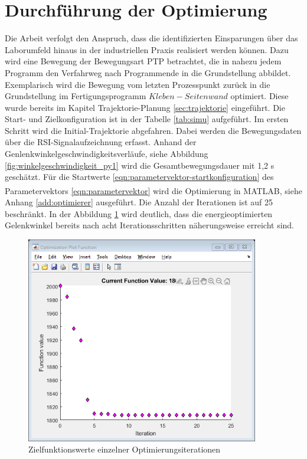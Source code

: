 \section{Durchführung der Optimierung}
Die Arbeit verfolgt den Anspruch, dass die identifizierten Einsparungen über das Laborumfeld hinaus in der industriellen Praxis realisiert werden können. Dazu wird eine Bewegung der Bewegungsart PTP betrachtet, die in nahezu jedem Programm den Verfahrweg nach Programmende in die Grundstellung abbildet. Exemplarisch wird die Bewegung vom letzten Prozesspunkt zurück in die Grundstellung im Fertigungsprogramm  $Kleben-Seitenwand$  optimiert. Diese wurde bereits im Kapitel Trajektorie-Planung \ref{sec:trajektorie} eingeführt. Die Start- und Zielkonfiguration ist in der Tabelle \ref{tab:simu} aufgeführt.  Im ersten Schritt wird die Initial-Trajektorie abgefahren. Dabei werden die Bewegungsdaten über die RSI-Signalaufzeichnung erfasst. Anhand der Genlenkwinkelgeschwindigkeitsverläufe, siehe Abbildung \ref{fig:winkelgeschwindigkeit_py1} wird die Gesamtbewegungsdauer mit 1,2 s geschätzt. Für die Startwerte \ref{eqn:parametervektor-startkonfiguration} des Parametervektors \ref{eqn:parametervektor} wird die Optimierung in MATLAB\textsuperscript{\textregistered}, siehe Anhang \ref{add:optimierer} ausgeführt. Die Anzahl der Iterationen ist auf 25 beschränkt. In der Abbildung \ref{fig:funktionswerte-iteration} wird deutlich, dass die energieoptimierten Gelenkwinkel bereits nach acht Iterationsschritten näherungsweise erreicht sind.
%
\begin{figure}[tbph]
	\centering
	\includegraphics [width=4in]{images/optimization_01}
	\caption{Zielfunktionswerte einzelner Optimierungsiterationen}
	\label{fig:funktionswerte-iteration}
\end{figure}
%

